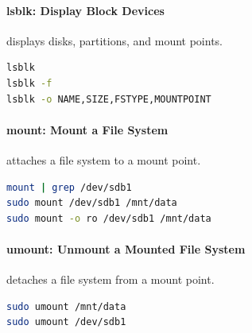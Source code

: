 \paragraph*{lsblk: Display Block Devices}
 displays disks, partitions, and mount points.
\begin{lstlisting}[language=bash]
lsblk
lsblk -f
lsblk -o NAME,SIZE,FSTYPE,MOUNTPOINT
\end{lstlisting}

\paragraph*{mount: Mount a File System}
 attaches a file system to a mount point.
\begin{lstlisting}[language=bash]
mount | grep /dev/sdb1
sudo mount /dev/sdb1 /mnt/data
sudo mount -o ro /dev/sdb1 /mnt/data
\end{lstlisting}

\paragraph*{umount: Unmount a Mounted File System}
 detaches a file system from a mount point.
\begin{lstlisting}[language=bash]
sudo umount /mnt/data
sudo umount /dev/sdb1
\end{lstlisting}
